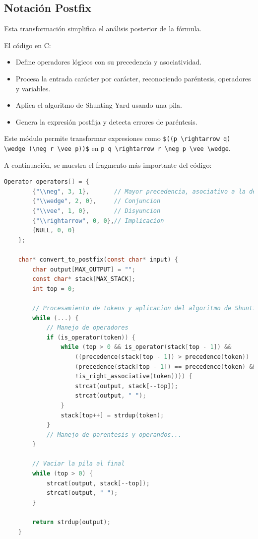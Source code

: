 \documentclass{report}
\begin{document}
	\newpage
	\subsection{Notaci\'on Postfix}

	Esta transformación simplifica el análisis posterior de la fórmula.

	El código en C:
	\begin{itemize}
		\item Define operadores lógicos con su precedencia y asociatividad.
		\item Procesa la entrada carácter por carácter, reconociendo paréntesis, operadores y variables.
		\item Aplica el algoritmo de Shunting Yard usando una pila.
		\item Genera la expresión postfija y detecta errores de paréntesis.
	\end{itemize}

	Este módulo permite transformar expresiones como \verb|$((p \rightarrow q) \wedge (\neg r \vee p))$| en \verb|p q \rightarrow r \neg p \vee \wedge|.

	A continuación, se muestra el fragmento más importante del código:


	\begin{lstlisting}[language=C, caption={Fragmento clave de la conversión a notación postfija}]
	Operator operators[] = {
		{"\\neg", 3, 1},       // Mayor precedencia, asociativo a la derecha
		{"\\wedge", 2, 0},     // Conjuncion
		{"\\vee", 1, 0},       // Disyuncion
		{"\\rightarrow", 0, 0},// Implicacion
		{NULL, 0, 0}
	};

	char* convert_to_postfix(const char* input) {
		char output[MAX_OUTPUT] = "";
		const char* stack[MAX_STACK];
		int top = 0;

		// Procesamiento de tokens y aplicacion del algoritmo de Shunting Yard
		while (...) {
			// Manejo de operadores
			if (is_operator(token)) {
				while (top > 0 && is_operator(stack[top - 1]) &&
					((precedence(stack[top - 1]) > precedence(token)) ||
					(precedence(stack[top - 1]) == precedence(token) &&
					!is_right_associative(token)))) {
					strcat(output, stack[--top]);
					strcat(output, " ");
				}
				stack[top++] = strdup(token);
			}
			// Manejo de parentesis y operandos...
		}

		// Vaciar la pila al final
		while (top > 0) {
			strcat(output, stack[--top]);
			strcat(output, " ");
		}

		return strdup(output);
	}
	\end{lstlisting}
\end{document}

